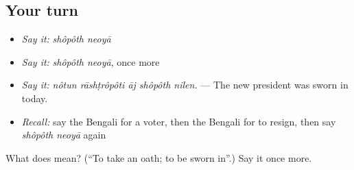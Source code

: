 \subsection*{Your turn}
\begin{itemize}
\raggedright
  \item \emph{Say it:} \emph{shôpôth neoyā}
  \item \emph{Say it:} \emph{shôpôth neoyā}, once more
  \item \emph{Say it:} \emph{nôtun rāshṭrôpôti āj shôpôth nilen.} — The new president was sworn in today.
  \item \emph{Recall:} say the Bengali for a voter, then the Bengali for to resign, then say \emph{shôpôth neoyā} again
\end{itemize}

\begin{tcolorbox}[breakable,colback=teal!4,colframe=teal!35!black,title={Before you move on}]
What does   mean? (\textquotedblleft{}To take an oath; to be sworn in\textquotedblright{}.) Say it once more.
\end{tcolorbox}

